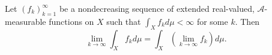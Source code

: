 Let $(f_k)_{k=1}^{\infty}$ be a nondecreasing sequence of extended real-valued, $\mathcal{A}$-measurable functions on $X$ such that $\int_X f_k d\mu < \infty$ for some $k$. Then $$\lim_{k \to \infty} \int_X f_k d\mu = \int_X \left( \lim_{k \to \infty} f_k \right) d\mu.$$
